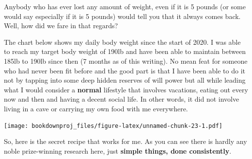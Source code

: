 \documentclass[
  oneside]{book}
\begin{document}
Anybody who has ever lost any amount of weight, even if it is 5 pounds (or some would say especially if it is 5 pounds) would tell you that it always comes back. Well, how did we fare in that regards?

The chart below shows my daily body weight since the start of 2020. I was able to reach my target body weight of 190lb and have been able to maintain between 185lb to 190lb since then (7 months as of this writing). No mean feat for someone who had never been fit before and the good part is that I have been able to do it not by tapping into some deep hidden reserves of will power but all while leading what I would consider a \textbf{normal} lifestyle that involves vacations, eating out every now and then and having a decent social life. In other words, it did not involve living in a cave or carrying my own food with me everywhere.

\texttt{[image: bookdownproj\_files/figure-latex/unnamed-chunk-23-1.pdf]}

So, here is the secret recipe that works for me. As you can see there is hardly any noble prize-winning research here, just \textbf{simple things, \textbf{done} \textbf{consistently}}.
\end{document}
